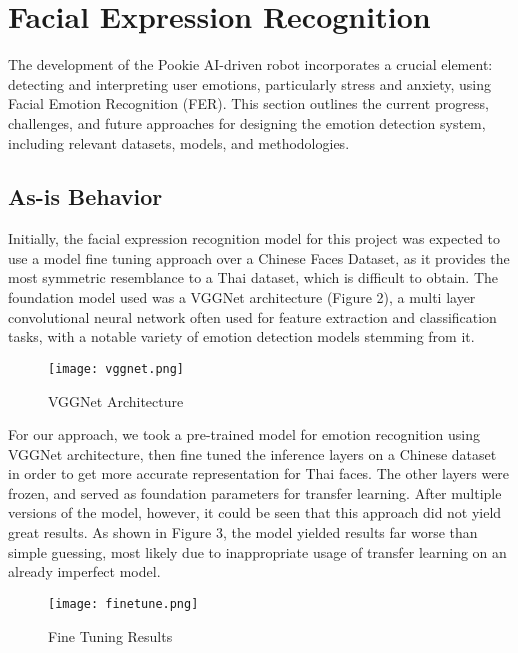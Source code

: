 \section{Facial Expression Recognition}
The development of the Pookie AI-driven robot incorporates a crucial element: detecting and interpreting user emotions, particularly stress and anxiety, using Facial Emotion Recognition (FER). This section outlines the current progress, challenges, and future approaches for designing the emotion detection system, including relevant datasets, models, and methodologies.
\subsection{As-is Behavior}
Initially, the facial expression recognition model for this project was expected to use a model fine tuning approach over a Chinese Faces Dataset, as it provides the most symmetric resemblance to a Thai dataset, which is difficult to obtain. The foundation model used was a VGGNet architecture (Figure 2), a multi layer convolutional neural network often used for feature extraction and classification tasks, with a notable variety of emotion detection models stemming from it. 

\begin{figure}[ht]
    \centering
    \captionsetup{justification=centering}
    \texttt{[image: vggnet.png]}
    \caption{VGGNet Architecture}
    \label{fig:vggnet}
\end{figure}

For our approach, we took a pre-trained model for emotion recognition using VGGNet architecture, then fine tuned the inference layers on a Chinese dataset in order to get more accurate representation for Thai faces. The other layers were frozen, and served as foundation parameters for transfer learning. After multiple versions of the model, however, it could be seen that this approach did not yield great results. As shown in Figure 3, the model yielded results far worse than simple guessing, most likely due to inappropriate usage of transfer learning on an already imperfect model. 

\begin{figure}[ht]
    \centering
    \captionsetup{justification=centering}
    \texttt{[image: finetune.png]}
    \caption{Fine Tuning Results}
    \label{fig:finetune}
\end{figure}

\newpage
